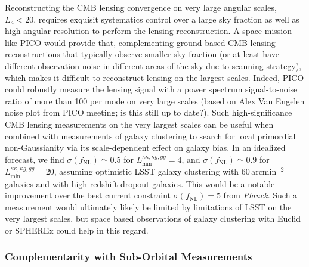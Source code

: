 \documentclass[PICOReport.tex]{subfiles}
\begin{document}
Reconstructing the CMB lensing convergence on very large angular scales, $L_\mathrm{\kappa}<20$, requires exquisit systematics control over a large sky fraction as well as high angular resolution to perform the lensing reconstruction. A space mission like PICO would provide that, complementing ground-based CMB lensing reconstructions that typically observe smaller sky fraction (or at least have different observation noise in different areas of the sky due to scanning strategy), which makes it difficult to reconstruct lensing on the largest scales.  Indeed,  PICO could robustly measure the lensing signal with a power spectrum signal-to-noise ratio of more than 100 per mode on very large scales (based on Alex Van Engelen noise plot from PICO meeting; is this still up to date?). Such high-significance CMB lensing measurements on the very largest scales can be useful when combined with measurements of  galaxy clustering to search for local primordial non-Gaussianity via its scale-dependent effect on galaxy bias. In an idealized forecast, we find $\sigma(f_\mathrm{NL})\simeq 0.5$ for $L_\mathrm{min}^{\kappa\kappa,\kappa g,gg}=4$, and $\sigma(f_\mathrm{NL})\simeq 0.9$ for $L_\mathrm{min}^{\kappa\kappa,\kappa g,gg}=20$, assuming optimistic LSST galaxy clustering with $60\,\mathrm{arcmin}^{-2}$ galaxies and with high-redshift dropout galaxies. This would be a notable improvement over the best current constraint $\sigma(f_\mathrm{NL})=5$ from {\it Planck}.  Such a measurement would ultimately likely be limited by limitations of LSST on the very largest scales, but space based observations of galaxy clustering with Euclid or SPHEREx could help in this regard.


\subsubsection{Complementarity with Sub-Orbital Measurements}

\end{document}
